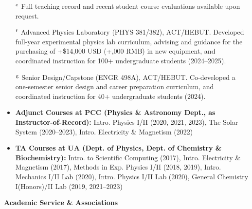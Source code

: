 \documentclass[11pt]{article}
\begin{document}
\begin{itemize}[leftmargin=*,nosep]
    \item[\(^{\rm e}\)] Full teaching record and recent student course evaluations available upon request.
    \item[\(^{\rm f}\)] Advanced Physics Laboratory (PHYS 381/382), ACT/HEBUT. Developed full-year experimental physics lab curriculum, advising and guidance for the purchasing of +\$14,000 USD (+,000 RMB) in new equipment, and coordinated instruction for 100+ undergraduate students (2024--2025).
    \item[\(^{\rm g}\)] Senior Design/Capstone (ENGR 498A), ACT/HEBUT. Co-developed a one-semester senior design and career preparation curriculum, and coordinated instruction for 40+ undergraduate students (2024).
\end{itemize}

\begin{itemize}[leftmargin=*,nosep]
    \item \textbf{Adjunct Courses at PCC (Physics \& Astronomy Dept., as Instructor-of-Record):} Intro. Physics I/II (2020, 2021, 2023), The Solar System (2020--2023), Intro. Electricity \& Magnetism (2022)
    \item \textbf{TA Courses at UA (Dept. of Physics, Dept. of Chemistry \& Biochemistry):} Intro. to Scientific Computing (2017), Intro. Electricity \& Magnetism (2017), Methods in Exp. Physics I/II (2018, 2019), Intro. Mechanics I/II Lab (2020), Intro. Physics I/II Lab (2020), General Chemistry I(Honors)/II Lab (2019, 2021--2023)
\end{itemize}

\medskip

{\Large\textbf{Academic Service \& Associations}}
\end{document}
